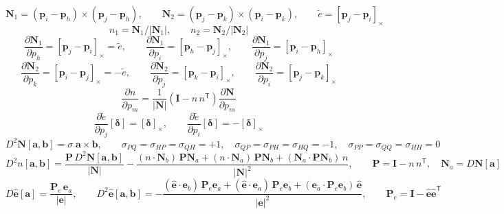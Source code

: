 \[ \mathbf{N}_1 = (\mathbf{p}_i - \mathbf{p}_h)\times(\mathbf{p}_j - \mathbf{p}_h),\qquad \mathbf{N}_2 = (\mathbf{p}_j - \mathbf{p}_k)\times(\mathbf{p}_i - \mathbf{p}_k),\qquad \tilde{e} = [\mathbf{p}_j - \mathbf{p}_i]_\times \]
\[ n_1 = \mathbf{N}_1/|\mathbf{N}_1|,\qquad n_2 = \mathbf{N}_2/|\mathbf{N}_2| \]
\[ \frac{\partial \mathbf{N}_1}{\partial p_h} = [\mathbf{p}_j - \mathbf{p}_i]_\times = \tilde{e},\qquad \frac{\partial \mathbf{N}_1}{\partial p_i} = [\mathbf{p}_h - \mathbf{p}_j]_\times,\qquad \frac{\partial \mathbf{N}_1}{\partial p_j} = [\mathbf{p}_i - \mathbf{p}_h]_\times \]
\[ \frac{\partial \mathbf{N}_2}{\partial p_k} = [\mathbf{p}_i - \mathbf{p}_j]_\times = -\tilde{e},\qquad \frac{\partial \mathbf{N}_2}{\partial p_j} = [\mathbf{p}_k - \mathbf{p}_i]_\times,\qquad \frac{\partial \mathbf{N}_2}{\partial p_i} = [\mathbf{p}_j - \mathbf{p}_k]_\times \]
\[ \frac{\partial n}{\partial p_m} = \frac{1}{|\mathbf{N}|}\left(\mathbf{I} - n\,n^{\mathsf T}\right)\frac{\partial \mathbf{N}}{\partial p_m} \]
\[ \frac{\partial \tilde{e}}{\partial p_j}[\boldsymbol\delta] = [\boldsymbol\delta]_\times,\qquad \frac{\partial \tilde{e}}{\partial p_i}[\boldsymbol\delta] = -[\boldsymbol\delta]_\times \]
\[ D^2\mathbf{N}[\mathbf{a}, \mathbf{b}] = \sigma\;\mathbf{a}\times\mathbf{b},\qquad \sigma_{PQ} = \sigma_{HP} = \sigma_{QH} = +1,\quad \sigma_{QP} = \sigma_{PH} = \sigma_{HQ} = -1,\quad \sigma_{PP} = \sigma_{QQ} = \sigma_{HH} = 0 \]
\[ D^2 n[\mathbf{a}, \mathbf{b}] = \frac{\mathbf{P}\,D^2\mathbf{N}[\mathbf{a}, \mathbf{b}]}{|\mathbf{N}|} - \frac{(n\cdot \mathbf{N}_b)\,\mathbf{P}\mathbf{N}_a + (n\cdot \mathbf{N}_a)\,\mathbf{P}\mathbf{N}_b + (\mathbf{N}_a\cdot\mathbf{P}\mathbf{N}_b)\,n}{|\mathbf{N}|^2},\qquad \mathbf{P} = \mathbf{I} - n\,n^{\mathsf T},\quad \mathbf{N}_a = D\mathbf{N}[\mathbf{a}] \]
\[ D\hat{\mathbf{e}}[\mathbf{a}] = \frac{\mathbf{P}_e\,\mathbf{e}_a}{|\mathbf{e}|},\qquad D^2\hat{\mathbf{e}}[\mathbf{a}, \mathbf{b}] = -\frac{(\hat{\mathbf{e}}\cdot\mathbf{e}_b)\,\mathbf{P}_e\mathbf{e}_a + (\hat{\mathbf{e}}\cdot\mathbf{e}_a)\,\mathbf{P}_e\mathbf{e}_b + (\mathbf{e}_a\cdot\mathbf{P}_e\mathbf{e}_b)\,\hat{\mathbf{e}}}{|\mathbf{e}|^2},\qquad \mathbf{P}_e = \mathbf{I} - \hat{\mathbf{e}}\hat{\mathbf{e}}^{\mathsf T} \]
